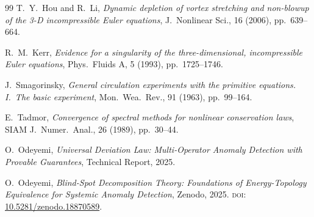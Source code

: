 \documentclass[final]{siamltex}
\begin{document}
\begin{thebibliography}{99}
T.~Y.~Hou and R.~Li,
\emph{Dynamic depletion of vortex stretching and non-blowup of
the 3-D incompressible Euler equations},
J.\ Nonlinear Sci., 16 (2006), pp.~639--664.

R.~M.~Kerr,
\emph{Evidence for a singularity of the three-dimensional,
incompressible Euler equations},
Phys.\ Fluids A, 5 (1993), pp.~1725--1746.

J.~Smagorinsky,
\emph{General circulation experiments with the primitive equations.
I.~The basic experiment},
Mon.\ Wea.\ Rev., 91 (1963), pp.~99--164.

E.~Tadmor,
\emph{Convergence of spectral methods for nonlinear conservation
laws},
SIAM J.\ Numer.\ Anal., 26 (1989), pp.~30--44.

O.~Odeyemi,
\emph{Universal Deviation Law: Multi-Operator Anomaly Detection
with Provable Guarantees},
Technical Report, 2025.

O.~Odeyemi,
\emph{Blind-Spot Decomposition Theory: Foundations of
Energy-Topology Equivalence for Systemic Anomaly Detection},
Zenodo, 2025.
\textsc{doi}: \href{https://doi.org/10.5281/zenodo.18870589}{10.5281/zenodo.18870589}.

\end{thebibliography}
\end{document}
